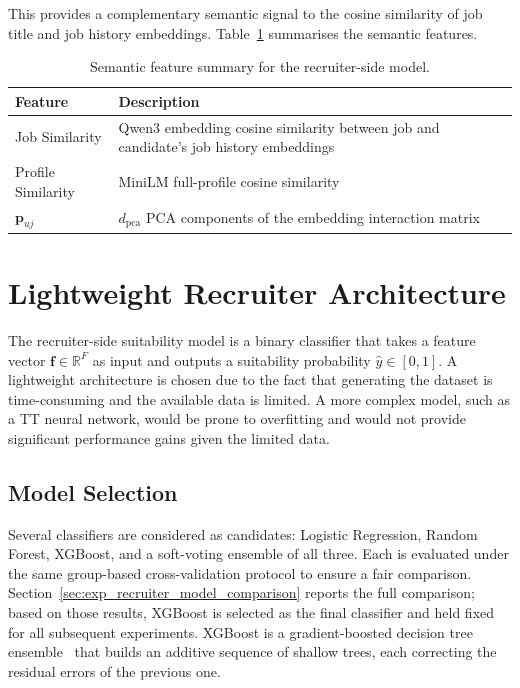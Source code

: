 This provides a complementary semantic signal to the cosine similarity of job title and job history embeddings. Table~\ref{tab:recruiter_semantic_features} summarises the semantic features. 

\begin{table}[htbp]
    \centering
    \caption{Semantic feature summary for the recruiter-side model.}
    \label{tab:recruiter_semantic_features}
    \begin{tabular}{lp{7cm}}
        \toprule
        \textbf{Feature} & \textbf{Description} \\
        \midrule
        Job Similarity & Qwen3 embedding cosine similarity between job and candidate's job history embeddings \\
        Profile Similarity & MiniLM full-profile cosine similarity \\
        $\mathbf{p}_{uj}$ & $d_{\text{pca}}$ PCA components of the embedding interaction matrix \\
        \bottomrule
    \end{tabular}
\end{table}


\section{Lightweight Recruiter Architecture}
\label{sec:recruiter_lightweight}

The recruiter-side suitability model is a binary classifier that takes a feature vector $\mathbf{f} \in \mathbb{R}^{F}$ as input and outputs a suitability probability $\hat{y} \in [0,1]$. A lightweight architecture is chosen due to the fact that generating the dataset is time-consuming and the available data is limited. A more complex model, such as a \gls{TT} neural network, would be prone to overfitting and would not provide significant performance gains given the limited data.

\subsection{Model Selection}

Several classifiers are considered as candidates: Logistic Regression, Random Forest, XGBoost, and a soft-voting ensemble of all three. Each is evaluated under the same group-based cross-validation protocol to ensure a fair comparison. Section~\ref{sec:exp_recruiter_model_comparison} reports the full comparison; based on those results, XGBoost is selected as the final classifier and held fixed for all subsequent experiments. XGBoost is a gradient-boosted decision tree ensemble~\cite{Chen_2016} 
that builds an additive sequence of shallow trees, each correcting 
the residual errors of the previous one. 


